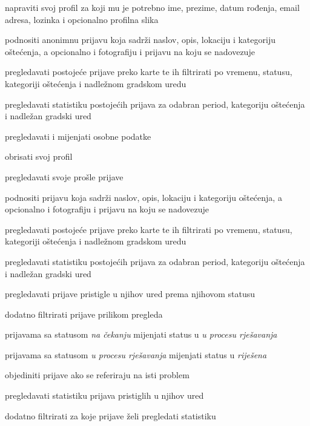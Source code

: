 			\begin{packed_enum}
				
				\item  {}
				\begin{packed_enum}
					\item napraviti svoj profil za koji mu je potrebno ime, prezime, datum rođenja, email adresa, lozinka i opcionalno profilna slika
					\item podnositi anonimnu prijavu koja sadrži naslov, opis, lokaciju i kategoriju oštećenja, a opcionalno i fotografiju i prijavu na koju se nadovezuje
					\item  pregledavati postojeće prijave preko karte te ih filtrirati po vremenu, statusu, kategoriji oštećenja i nadležnom gradskom uredu
					\item pregledavati statistiku postojećih prijava za odabran period, kategoriju oštećenja i nadležan gradski ured			
				\end{packed_enum}
								
				\item  {}				
				\begin{packed_enum}					
					\item pregledavati i mijenjati osobne podatke
					\item obrisati svoj profil
					\item pregledavati svoje prošle prijave
					\item podnositi prijavu koja sadrži naslov, opis, lokaciju i kategoriju oštećenja, a opcionalno i fotografiju i prijavu na koju se nadovezuje
					\item  pregledavati postojeće prijave preko karte te ih filtrirati po vremenu, statusu, kategoriji oštećenja i nadležnom gradskom uredu
					\item pregledavati statistiku postojećih prijava za odabran period, kategoriju oštećenja i nadležan gradski ured
				\end{packed_enum}
				
				\item  {}
				\begin{packed_enum}
					\item pregledavati prijave pristigle u njihov ured prema njihovom statusu
					\item dodatno filtrirati prijave prilikom pregleda
					\item prijavama sa statusom \textit{na čekanju} mijenjati status u \textit{u procesu rješavanja}
					\item prijavama sa statusom \textit{u procesu rješavanja} mijenjati status u \textit{riješena}
					\item objediniti prijave ako se referiraju na isti problem
					\item pregledavati statistiku prijava pristiglih u njihov ured
					\item dodatno filtrirati za koje prijave želi pregledati statistiku
				\end{packed_enum}
				

\end{packed_enum}
